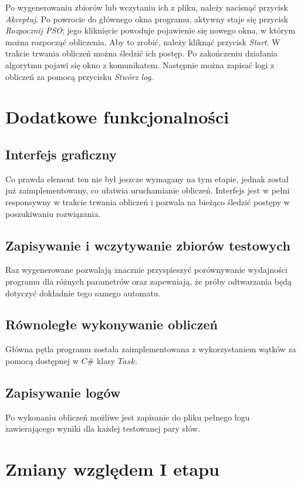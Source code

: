 \documentclass{../llncs_template/llncs}
\begin{document}
Po wygenerowaniu zbiorów lub wczytaniu ich z pliku, należy nacisnąć przycisk \emph{Akceptuj}. Po powrocie do głównego okna programu, aktywny staje się przycisk \emph{Rozpocznij PSO}; jego kliknięcie powoduje pojawienie się nowego okna, w którym można rozpocząć obliczenia. Aby to zrobić, należy kliknąć przycisk \emph{Start}. W trakcie trwania obliczeń można śledzić ich postęp. Po zakończeniu działania algorytmu pojawi się okno z komunikatem. Następnie można zapisać logi z obliczeń za pomocą przycisku \emph{Stwórz log}.

\section{Dodatkowe funkcjonalności}

\subsection{Interfejs graficzny}
Co prawda element ten nie był jeszcze wymagany na tym etapie, jednak został już zaimplementowany, co ułatwia uruchamianie obliczeń. Interfejs jest w pełni responsywny w trakcie trwania obliczeń i pozwala na bieżąco śledzić postępy w poszukiwaniu rozwiązania.

\subsection{Zapisywanie i wczytywanie zbiorów testowych}
Raz wygenerowane pozwalają znacznie przyspieszyć porównywanie wydajności programu dla różnych parametrów oraz zapewniają, że próby odtwarzania będą dotyczyć dokładnie tego samego automatu.

\subsection{Równoległe wykonywanie obliczeń}
Główna pętla programu została zaimplementowana z wykorzystaniem wątków za pomocą dostępnej w $C\#$ klasy $Task$.

\subsection{Zapisywanie logów}
Po wykonaniu obliczeń możliwe jest zapisanie do pliku pełnego logu zawierającego wyniki dla każdej testowanej pary słów.

\section{Zmiany względem I etapu}
\end{document}
